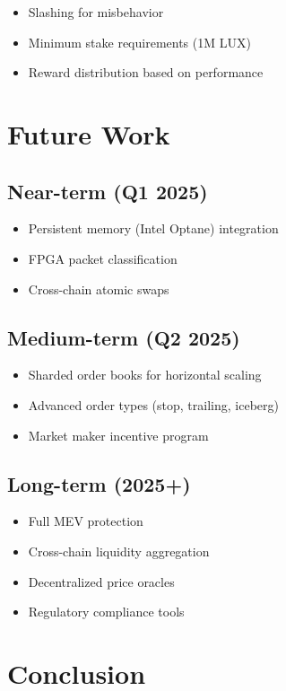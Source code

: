 \documentclass[11pt,a4paper]{article}
\begin{document}
\begin{itemize}
    \item Slashing for misbehavior
    \item Minimum stake requirements (1M LUX)
    \item Reward distribution based on performance
\end{itemize}

\section{Future Work}

\subsection{Near-term (Q1 2025)}
\begin{itemize}
    \item Persistent memory (Intel Optane) integration
    \item FPGA packet classification
    \item Cross-chain atomic swaps
\end{itemize}

\subsection{Medium-term (Q2 2025)}
\begin{itemize}
    \item Sharded order books for horizontal scaling
    \item Advanced order types (stop, trailing, iceberg)
    \item Market maker incentive program
\end{itemize}

\subsection{Long-term (2025+)}
\begin{itemize}
    \item Full MEV protection
    \item Cross-chain liquidity aggregation
    \item Decentralized price oracles
    \item Regulatory compliance tools
\end{itemize}

\section{Conclusion}
\end{document}
